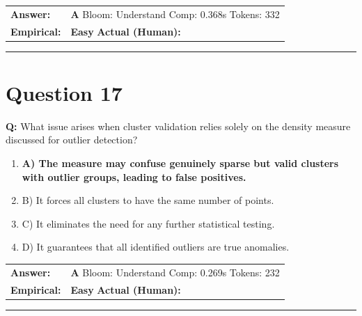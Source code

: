 \documentclass[9pt]{article}
\begin{document}
\begin{tabular}{@{}l p{10.5cm}@{}}
\textbf{Answer:} & \textbf{A} \hspace{1em} Bloom: Understand \hspace{1em} Comp: 0.368s \hspace{1em} Tokens: 332 \\
\textbf{Empirical:} & \textbf{Easy} \hspace{1em} \textbf{Actual (Human):} \underline{\hspace{5cm}}
\end{tabular}

\vspace{0.2cm}
\rule{\textwidth}{0.4pt}
\vspace{0.2cm}


\section*{Question 17}

\textbf{Q:} What issue arises when cluster validation relies solely on the density measure discussed for outlier detection?

\begin{enumerate}[label=\textbf{\alph{*})}, nosep]
    \item \textbf{A) The measure may confuse genuinely sparse but valid clusters with outlier groups, leading to false positives.} %
    \item B) It forces all clusters to have the same number of points.
    \item C) It eliminates the need for any further statistical testing.
    \item D) It guarantees that all identified outliers are true anomalies.

\end{enumerate}

\begin{tabular}{@{}l p{10.5cm}@{}}
\textbf{Answer:} & \textbf{A} \hspace{1em} Bloom: Understand \hspace{1em} Comp: 0.269s \hspace{1em} Tokens: 232 \\
\textbf{Empirical:} & \textbf{Easy} \hspace{1em} \textbf{Actual (Human):} \underline{\hspace{5cm}}
\end{tabular}

\vspace{0.2cm}
\rule{\textwidth}{0.4pt}
\vspace{0.2cm}
\end{document}

